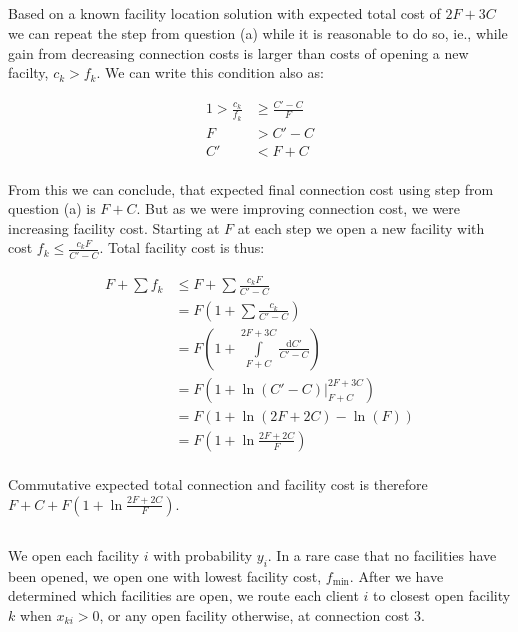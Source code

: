 \documentclass[a4paper,11pt,oneside,onecolumn]{article}
\begin{document}
\subsection{}

Based on a known facility location solution with expected total cost of $2F + 3C$ we can repeat the step from question (a) while it
is reasonable to do so, ie., while gain from decreasing connection costs is larger than costs of opening a new facilty,
$c_k > f_k$. We can write this condition also as:

\begin{align*}
1 > \frac{c_k}{f_k} & \ge \frac{C' - C}{F} \\
F & > C' - C \\
C' & < F + C \\
\end{align*}

From this we can conclude, that expected final connection cost using step from question (a) is $F + C$. But as we were improving
connection cost, we were increasing facility cost. Starting at $F$ at each step we open a new facility with cost
$f_k \le \frac{c_k F}{C' - C}$. Total facility cost is thus:

\begin{align*}
F + \sum f_k & \le F + \sum \frac{c_k F}{C' - C} \\
& = F\left(1 + \sum \frac{c_k}{C' - C}\right) \\
& = F\left(1 + \int\limits_{F+C}^{2F + 3C} \frac{\mathrm{d}C'}{C' - C}\right) \\
& = F\left(\left. 1 + \ln(C' - C)\right|_{F+C}^{2F + 3C} \right) \\
& = F\left( 1 + \ln(2F + 2C) - \ln(F) \right) \\
& = F\left( 1 + \ln\frac{2F + 2C}{F} \right) \\
\end{align*}

Commutative expected total connection and facility cost is therefore $F + C + F\left( 1 + \ln\frac{2F + 2C}{F} \right)$.

\subsection{}

We open each facility $i$ with probability $y_i$. In a rare case that no facilities have been opened, we open one with
lowest facility cost, $f_{\min}$. After we have determined which facilities are open, we route each client $i$ to closest open
facility $k$ when $x_{ki} > 0$, or any open facility otherwise, at connection cost $3$.
\end{document}
